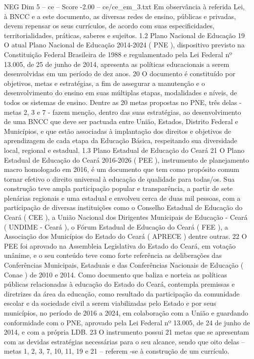 \begin{textsample}{NEG Dim 5 – ce – Score -2.00 – ce/ce\_em\_3.txt}
Em observância à referida Lei, à BNCC e a este documento, as diversas redes de ensino, públicas e privadas, devem repensar os seus currículos, de acordo com suas especificidades, territorialidades, práticas, saberes e sujeitos. 1.2 Plano Nacional de Educação 19 O atual Plano Nacional de Educação 2014-2024 ( PNE ), dispositivo previsto na Constituição Federal Brasileira de 1988 e regulamentado pela Lei Federal nº 13.005, de 25 de junho de 2014, apresenta as políticas educacionais a serem desenvolvidas em um período de dez anos. 20 O documento é constituído por objetivos, metas e estratégias, a fim de assegurar a manutenção e o desenvolvimento do ensino em suas múltiplas etapas, modalidades e níveis, de todos os sistemas de ensino.
Dentre as 20 metas propostas no PNE, três delas - metas 2, 3 e 7 - fazem menção, dentro das suas estratégias, ao desenvolvimento de uma BNCC que deve ser pactuada entre União, Estados, Distrito Federal e Municípios, e que estão associadas à implantação dos direitos e objetivos de aprendizagem de cada etapa da Educação Básica, respeitando sua diversidade local, regional e estadual. 1.3 Plano Estadual de Educação do Ceará 21 O Plano Estadual de Educação do Ceará 2016-2026 ( PEE ), instrumento de planejamento macro homologado em 2016, é um documento que tem como propósito comum tornar efetivo o direito universal à educação de qualidade para todas/os.
Sua construção teve ampla participação popular e transparência, a partir de sete plenárias regionais e uma estadual e envolveu cerca de duas mil pessoas, com a participação de diversas instituições como o Conselho Estadual de Educação do Ceará ( CEE ), a União Nacional dos Dirigentes Municipais de Educação - Ceará ( UNDIME - Ceará ), o Fórum Estadual de Educação do Ceará ( FEE ), a Associação dos Municípios do Estado do Ceará ( APRECE ) dentre outras. 22 O PEE foi aprovado na Assembleia Legislativa do Estado do Ceará, em votação unânime, e o seu conteúdo teve como forte referência as deliberações das Conferências Municipais, Estaduais e das Conferências Nacionais de Educação ( Conae ) de 2010 e 2014.
Como documento que baliza e norteia as políticas públicas relacionadas à educação do Estado do Ceará, contempla premissas e diretrizes da área da educação, como resultado da participação da comunidade escolar e da sociedade civil a serem viabilizadas pelo Estado e por seus municípios, no período de 2016 a 2024, em colaboração com a União e guardando conformidade com o PNE, aprovado pela Lei Federal nº 13.005, de 24 de junho de 2014, e com a própria LDB. 23 O instrumento possui 21 metas que se apresentam com as devidas estratégias necessárias para o seu alcance, sendo que oito delas – metas 1, 2, 3, 7, 10, 11, 19 e 21 – referem -se à construção de um currículo.

\end{textsample}
